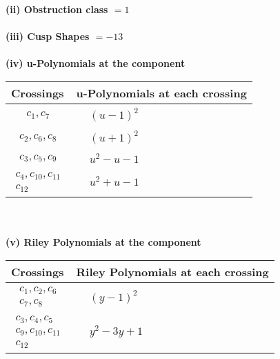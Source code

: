 \documentclass[1p]{elsarticle_modified}
\theoremstyle{definition}
\begin{document}
\flushleft \textbf{(ii) Obstruction class $= 1$}\\~\\
\flushleft \textbf{(iii) Cusp Shapes $= -13$}\\~\\
\newpage\renewcommand{\arraystretch}{1}
\flushleft \textbf{(iv) u-Polynomials at the component}\newline \\
\begin{tabular}{m{50pt}|m{274pt}}
Crossings & \hspace{64pt}u-Polynomials at each crossing \\
\hline $$\begin{aligned}c_{1},c_{7}\end{aligned}$$&$\begin{aligned}
&(u-1)^2
\end{aligned}$\\
\hline $$\begin{aligned}c_{2},c_{6},c_{8}\end{aligned}$$&$\begin{aligned}
&(u+1)^2
\end{aligned}$\\
\hline $$\begin{aligned}c_{3},c_{5},c_{9}\end{aligned}$$&$\begin{aligned}
&u^2- u-1
\end{aligned}$\\
\hline $$\begin{aligned}c_{4},c_{10},c_{11}\\c_{12}\end{aligned}$$&$\begin{aligned}
&u^2+u-1
\end{aligned}$\\
\hline
\end{tabular}\\~\\
\newpage\renewcommand{\arraystretch}{1}
\flushleft \textbf{(v) Riley Polynomials at the component}\newline \\
\begin{tabular}{m{50pt}|m{274pt}}
Crossings & \hspace{64pt}Riley Polynomials at each crossing \\
\hline $$\begin{aligned}c_{1},c_{2},c_{6}\\c_{7},c_{8}\end{aligned}$$&$\begin{aligned}
&(y-1)^2
\end{aligned}$\\
\hline $$\begin{aligned}c_{3},c_{4},c_{5}\\c_{9},c_{10},c_{11}\\c_{12}\end{aligned}$$&$\begin{aligned}
&y^2-3 y+1
\end{aligned}$\\
\hline
\end{tabular}\\~\\
\end{document}
